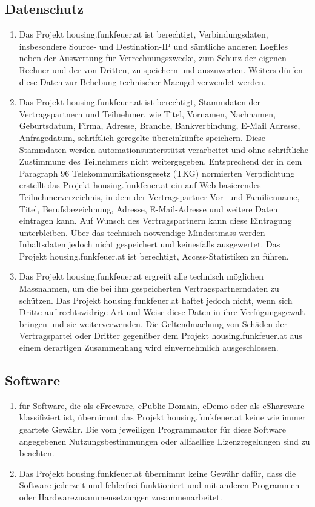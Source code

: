 \documentclass[parskip=half]{article}
\begin{document}
\subsection{ Datenschutz}
\begin{enumerate}
\item Das Projekt housing.funkfeuer.at ist berechtigt, Verbindungsdaten, insbesondere Source-
und Destination-IP und sämtliche anderen Logfiles neben der Auswertung für
Verrechnungszwecke, zum Schutz der eigenen Rechner und der von Dritten, zu speichern
und auszuwerten. Weiters dürfen diese Daten zur Behebung technischer Maengel
verwendet werden.
\item Das Projekt housing.funkfeuer.at ist berechtigt, Stammdaten der Vertragspartnern und
Teilnehmer, wie Titel, Vornamen, Nachnamen, Geburtsdatum, Firma, Adresse, Branche,
Bankverbindung, E-Mail Adresse, Anfragedatum, schriftlich geregelte übereinkünfte
speichern. Diese Stammdaten werden automationsunterstützt verarbeitet und ohne
schriftliche Zustimmung des Teilnehmers nicht weitergegeben. Entsprechend der in dem
Paragraph 96 Telekommunikationsgesetz (TKG) normierten Verpflichtung erstellt das
Projekt housing.funkfeuer.at ein auf Web basierendes Teilnehmerverzeichnis, in dem der
Vertragspartner Vor- und Familienname, Titel, Berufsbezeichnung, Adresse, E-Mail-Adresse
und weitere Daten eintragen kann. Auf Wunsch des Vertragspartnern kann diese
Eintragung unterbleiben. Über das technisch notwendige Mindestmass werden
Inhaltsdaten jedoch nicht gespeichert und keinesfalls ausgewertet. Das Projekt
housing.funkfeuer.at ist berechtigt, Access-Statistiken zu führen.
\item Das Projekt housing.funkfeuer.at ergreift alle technisch möglichen Massnahmen, um die
bei ihm gespeicherten Vertragspartnerndaten zu schützen. Das Projekt
housing.funkfeuer.at haftet jedoch nicht, wenn sich Dritte auf rechtswidrige Art und Weise
diese Daten in ihre Verfügungsgewalt bringen und sie weiterverwenden. Die
Geltendmachung von Schäden der Vertragspartei oder Dritter gegenüber dem Projekt
housing.funkfeuer.at aus einem derartigen Zusammenhang wird einvernehmlich
ausgeschlossen.
\end{enumerate}

\subsection{Software}
\begin{enumerate}
\item für Software, die als eFreeware, ePublic Domain, eDemo oder als eShareware
klassifiziert ist, übernimmt das Projekt housing.funkfeuer.at keine wie immer geartete
Gewähr. Die vom jeweiligen Programmautor für diese Software angegebenen
Nutzungsbestimmungen oder allfaellige Lizenzregelungen sind zu beachten.
\item Das Projekt housing.funkfeuer.at übernimmt keine Gewähr dafür, dass die Software
jederzeit und fehlerfrei funktioniert und mit anderen Programmen oder
Hardwarezusammensetzungen zusammenarbeitet.
\end{enumerate}
\end{document}
